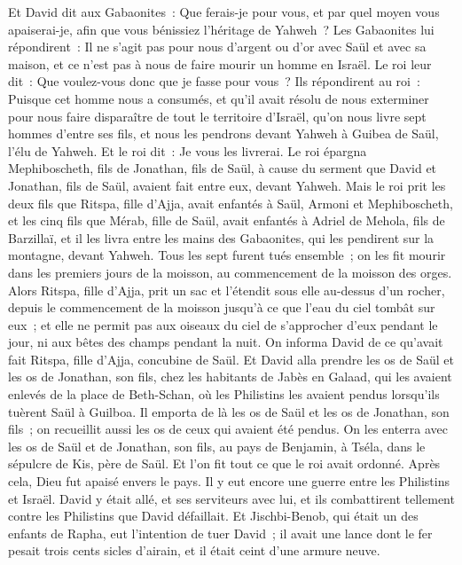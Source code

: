 \begin{multicols}{2}
Et David dit aux Gabaonites~: Que ferais-je pour vous, et par quel moyen vous apaiserai-je, afin que vous bénissiez l'héritage de Yahweh~?
Les Gabaonites lui répondirent~: Il ne s'agit pas pour nous d'argent ou d'or avec Saül et avec sa maison, et ce n'est pas à nous de faire mourir un homme en Israël. Le roi leur dit~: Que voulez-vous donc que je fasse pour vous~?
Ils répondirent au roi~: Puisque cet homme nous a consumés, et qu'il avait résolu de nous exterminer pour nous faire disparaître de tout le territoire d'Israël,
qu'on nous livre sept hommes d'entre ses fils, et nous les pendrons devant Yahweh à Guibea de Saül, l'élu de Yahweh. Et le roi dit~: Je vous les livrerai.
Le roi épargna Mephiboscheth, fils de Jonathan, fils de Saül, à cause du serment que David et Jonathan, fils de Saül, avaient fait entre eux, devant Yahweh.
Mais le roi prit les deux fils que Ritspa, fille d'Ajja, avait enfantés à Saül, Armoni et Mephiboscheth, et les cinq fils que Mérab, fille de Saül, avait enfantés à Adriel de Mehola, fils de Barzillaï,
et il les livra entre les mains des Gabaonites, qui les pendirent sur la montagne, devant Yahweh. Tous les sept furent tués ensemble~; on les fit mourir dans les premiers jours de la moisson, au commencement de la moisson des orges.
Alors Ritspa, fille d'Ajja, prit un sac et l'étendit sous elle au-dessus d'un rocher, depuis le commencement de la moisson jusqu'à ce que l'eau du ciel tombât sur eux~; et elle ne permit pas aux oiseaux du ciel de s'approcher d'eux pendant le jour, ni aux bêtes des champs pendant la nuit.
On informa David de ce qu'avait fait Ritspa, fille d'Ajja, concubine de Saül.
Et David alla prendre les os de Saül et les os de Jonathan, son fils, chez les habitants de Jabès en Galaad, qui les avaient enlevés de la place de Beth-Schan, où les Philistins les avaient pendus lorsqu'ils tuèrent Saül à Guilboa.
Il emporta de là les os de Saül et les os de Jonathan, son fils~; on recueillit aussi les os de ceux qui avaient été pendus.
On les enterra avec les os de Saül et de Jonathan, son fils, au pays de Benjamin, à Tséla, dans le sépulcre de Kis, père de Saül. Et l'on fit tout ce que le roi avait ordonné. Après cela, Dieu fut apaisé envers le pays.
Il y eut encore une guerre entre les Philistins et Israël. David y était allé, et ses serviteurs avec lui, et ils combattirent tellement contre les Philistins que David défaillait.
Et Jischbi-Benob, qui était un des enfants de Rapha, eut l'intention de tuer David~; il avait une lance dont le fer pesait trois cents sicles d'airain, et il était ceint d'une armure neuve.

\end{multicols}
